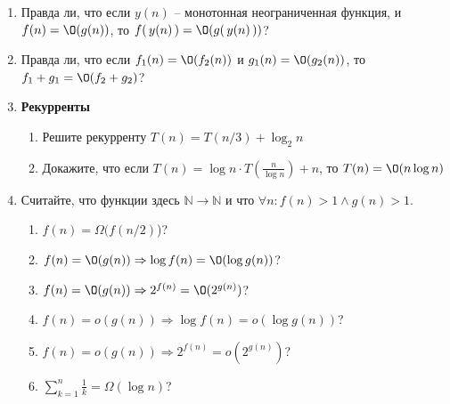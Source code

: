 \begin{enumerate}
  \item Правда ли, что если $y(n)$ -- монотонная
    неограниченная функция, и $f(n) = \O(g(n))$, то
    $f(\,y(n)\,) = \O(g(\,y(n)\,))$?
    
  \item
    Правда ли, что если $f_1(n) = \O(f_2(n))$ и $g_1(n) = \O(g_2(n))$, то $f_1 + g_1 = \O(f_2 + g_2)$?
    
  \item
  	{\bf Рекурренты}
  	\begin{enumerate}
  		\item Решите рекурренту $T(n) = T(n/3) + \log_2 n$
  		\item Докажите, что если $T(n) = \log n \cdot T\!\left(\frac{n}{\log n}\right) + n$, то $T(n) = \O(n \log n)$
  	\end{enumerate}
    

  \item
  Считайте, что функции здесь $\mathbb{N} \to \mathbb{N}$ и что $\forall n : f(n) > 1 \land g(n) > 1$.
    \begin{enumerate}
      \item $f(n) = \Omega(f(n \slash 2)$)?
      \item $f(n) = \O(g(n)) \Rightarrow \log f(n) = \O(\log g(n))$?
      \item $f(n) = \O(g(n)) \Rightarrow 2^{f(n)} = \O(2^{g(n)})$?
      \item $f(n) = o(g(n)) \Rightarrow \log f(n) = o(\log g(n))$?
      \item $f(n) = o(g(n)) \Rightarrow 2^{f(n)} = o(2^{g(n)})$?
      \item $\sum\limits_{k = 1}^n \frac{1}{k} = \Omega(\log n)$?
    \end{enumerate}


\end{enumerate}
